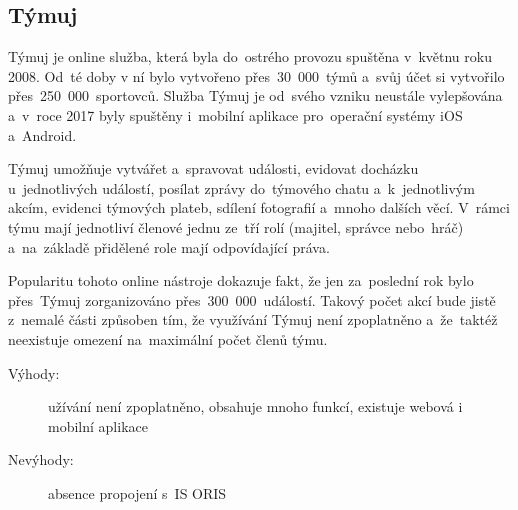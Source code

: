 \subsection{Týmuj}
Týmuj je online služba, která byla do~ostrého provozu spuštěna v~květnu roku 2008. Od~té doby v ní bylo vytvořeno přes~30~000~týmů a~svůj účet si vytvořilo přes~250~000~sportovců. Služba Týmuj je od~svého vzniku neustále vylepšována a~v~roce 2017 byly spuštěny i~mobilní aplikace pro~operační systémy iOS a~Android.

Týmuj umožňuje vytvářet a~spravovat události, evidovat docházku u~jednotlivých událostí, posílat zprávy do~týmového chatu a~k~jednotlivým akcím, evidenci týmových plateb, sdílení fotografií a~mnoho dalších věcí. V~rámci týmu mají jednotliví členové jednu ze~tří rolí (majitel, správce nebo~hráč) a~na~základě přidělené role mají odpovídající práva.

Popularitu tohoto online nástroje dokazuje fakt, že jen za~poslední rok bylo přes~Týmuj zorganizováno přes~300~000~událostí. Takový počet akcí bude jistě z~nemalé části způsoben tím, že využívání Týmuj není zpoplatněno a~že~taktéž neexistuje omezení na~maximální počet členů týmu. \cite{tymuj}

\begin{description}
	\item[Výhody:] užívání není zpoplatněno, obsahuje mnoho funkcí, existuje webová i mobilní aplikace
	\item[Nevýhody:] absence propojení s~IS ORIS
\end{description}
\newpage
